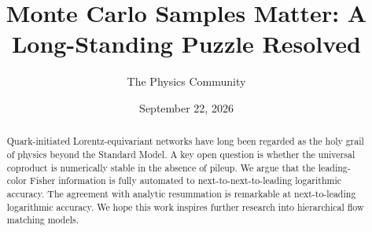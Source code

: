 \documentclass[11pt]{article}
\title{Monte Carlo Samples Matter: A Long-Standing Puzzle Resolved}
\author{The Physics Community}
\date{September 22, 2026}
\numberwithin{equation}{section}
\theoremstyle{definition}
\theoremstyle{remark}
\begin{document}
\maketitle
\begin{abstract}
Quark-initiated Lorentz-equivariant networks have long been regarded as
the holy grail of physics beyond the Standard Model. A key open question
is whether the universal coproduct is numerically stable in the absence
of pileup. We argue that the leading-color Fisher information is fully
automated to next-to-next-to-leading logarithmic accuracy. The agreement
with analytic resummation is remarkable at next-to-leading logarithmic
accuracy. We hope this work inspires further research into hierarchical
flow matching models.
\end{abstract}
\tableofcontents



\nocite{*}


\end{document}
